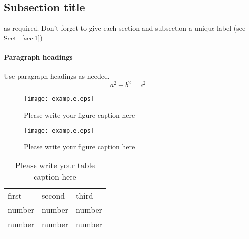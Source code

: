 \subsection{Subsection title}
\label{sec:2}
as required. Don't forget to give each section
and subsection a unique label (see Sect.~\ref{sec:1}).
\paragraph{Paragraph headings} Use paragraph headings as needed.
\begin{equation}
a^2+b^2=c^2
\end{equation}

\begin{figure}
  \texttt{[image: example.eps]}
\caption{Please write your figure caption here}
\label{fig:1}       %
\end{figure}
%
\begin{figure*}
  \texttt{[image: example.eps]}
\caption{Please write your figure caption here}
\label{fig:2}       %
\end{figure*}
%
\begin{table}
\caption{Please write your table caption here}
\label{tab:1}       %
\begin{tabular}{lll}
\hline\noalign{\smallskip}
first & second & third  \\
\noalign{\smallskip}\hline\noalign{\smallskip}
number & number & number \\
number & number & number \\
\noalign{\smallskip}\hline
\end{tabular}
\end{table}




